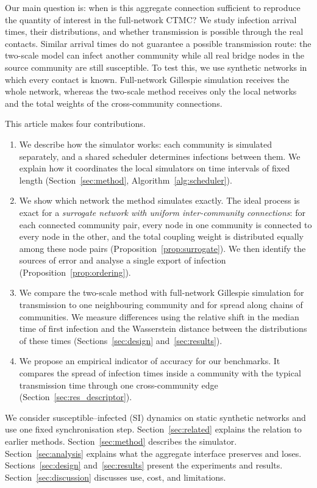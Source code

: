 \documentclass[a4paper,fleqn]{cas-sc}
\begin{document}
Our main question is: when is this aggregate connection sufficient to reproduce the quantity of interest in the full-network CTMC? We study infection arrival times, their distributions, and whether transmission is possible through the real contacts. Similar arrival times do not guarantee a possible transmission route: the two-scale model can infect another community while all real bridge nodes in the source community are still susceptible. To test this, we use synthetic networks in which every contact is known. Full-network Gillespie simulation receives the whole network, whereas the two-scale method receives only the local networks and the total weights of the cross-community connections.

This article makes four contributions.
\begin{enumerate}
\item We describe how the simulator works: each community is simulated separately, and a shared scheduler determines infections between them. We explain how it coordinates the local simulators on time intervals of fixed length (Section~\ref{sec:method}, Algorithm~\ref{alg:scheduler}).
\item We show which network the method simulates exactly. The ideal process is exact for a \emph{surrogate network with uniform inter-community connections}: for each connected community pair, every node in one community is connected to every node in the other, and the total coupling weight is distributed equally among these node pairs (Proposition~\ref{prop:surrogate}). We then identify the sources of error and analyse a single export of infection (Proposition~\ref{prop:ordering}).
\item We compare the two-scale method with full-network Gillespie simulation for transmission to one neighbouring community and for spread along chains of communities. We measure differences using the relative shift in the median time of first infection and the Wasserstein distance between the distributions of these times (Sections~\ref{sec:design} and~\ref*{sec:results}).
\item We propose an empirical indicator of accuracy for our benchmarks. It compares the spread of infection times inside a community with the typical transmission time through one cross-community edge (Section~\ref*{sec:res_descriptor}).
\end{enumerate}

We consider susceptible--infected (SI) dynamics on static synthetic networks and use one fixed synchronisation step. Section~\ref{sec:related} explains the relation to earlier methods. Section~\ref{sec:method} describes the simulator. Section~\ref{sec:analysis} explains what the aggregate interface preserves and loses. Sections~\ref{sec:design} and~\ref*{sec:results} present the experiments and results. Section~\ref*{sec:discussion} discusses use, cost, and limitations.
\end{document}
